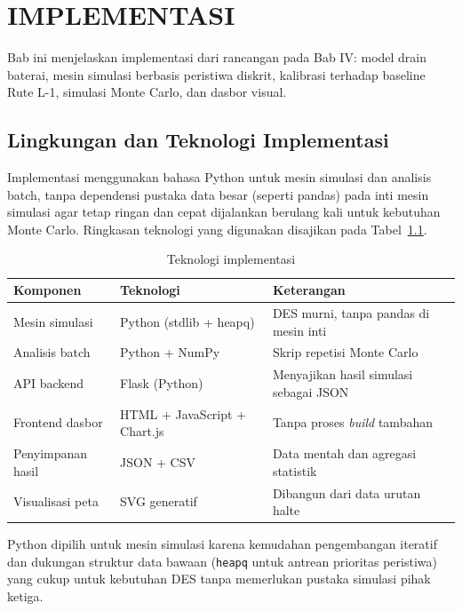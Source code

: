 \cleardoublepage
\chapter{IMPLEMENTASI}
\label{chap:implementasi}

Bab ini menjelaskan implementasi dari rancangan pada Bab IV: model drain
baterai, mesin simulasi berbasis peristiwa diskrit, kalibrasi terhadap
baseline Rute L-1, simulasi Monte Carlo, dan dasbor visual.

\section{Lingkungan dan Teknologi Implementasi}

Implementasi menggunakan bahasa Python untuk mesin simulasi dan analisis
batch, tanpa dependensi pustaka data besar (seperti pandas) pada inti mesin
simulasi agar tetap ringan dan cepat dijalankan berulang kali untuk
kebutuhan Monte Carlo. Ringkasan teknologi yang digunakan disajikan pada
Tabel~\ref{tab:tech-stack}.

\begin{table}[h]
	\centering
	\caption{Teknologi implementasi}
	\label{tab:tech-stack}
	\begin{tabularx}{\linewidth}{|l|l|X|}
		\hline
		\textbf{Komponen} & \textbf{Teknologi} & \textbf{Keterangan} \\
		\hline
		Mesin simulasi & Python (stdlib + heapq) & DES murni, tanpa pandas di mesin inti \\
		\hline
		Analisis batch & Python + NumPy & Skrip repetisi Monte Carlo \\
		\hline
		API backend & Flask (Python) & Menyajikan hasil simulasi sebagai JSON \\
		\hline
		Frontend dasbor & HTML + JavaScript + Chart.js & Tanpa proses \textit{build} tambahan \\
		\hline
		Penyimpanan hasil & JSON + CSV & Data mentah dan agregasi statistik \\
		\hline
		Visualisasi peta & SVG generatif & Dibangun dari data urutan halte \\
		\hline
	\end{tabularx}
\end{table}

Python dipilih untuk mesin simulasi karena kemudahan pengembangan iteratif
dan dukungan struktur data bawaan (\texttt{heapq} untuk antrean prioritas
peristiwa) yang cukup untuk kebutuhan DES tanpa memerlukan pustaka simulasi
pihak ketiga.

